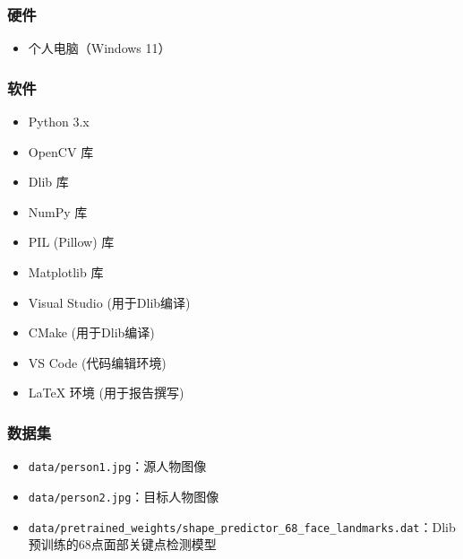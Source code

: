 \subsubsection{硬件}
\begin{itemize}
    \item 个人电脑（Windows 11）
\end{itemize}

\subsubsection{软件}
\begin{itemize}
    \item Python 3.x
    \item OpenCV 库
    \item Dlib 库
    \item NumPy 库
    \item PIL (Pillow) 库
    \item Matplotlib 库
    \item Visual Studio (用于Dlib编译)
    \item CMake (用于Dlib编译)
    \item VS Code (代码编辑环境)
    \item LaTeX 环境 (用于报告撰写)
\end{itemize}

\subsubsection{数据集}
\begin{itemize}
    \item \texttt{data/person1.jpg}：源人物图像
    \item \texttt{data/person2.jpg}：目标人物图像
    \item \texttt{data/pretrained_weights/shape_predictor_68_face_landmarks.dat}：Dlib预训练的68点面部关键点检测模型
\end{itemize}
